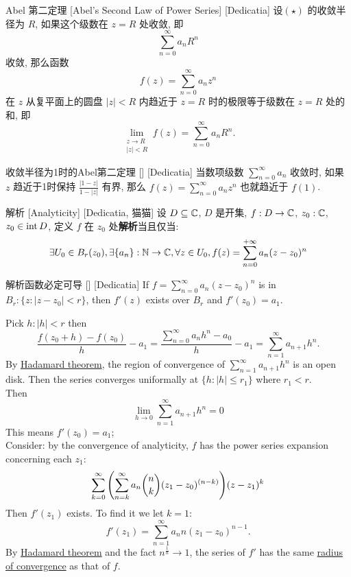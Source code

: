         \begin{thm}
            [Abel]
            {Abel 第二定理}
            [Abel's Second Law of Power Series]
            [Dedicatia]
            设\PowerSeries  \((\star)\) 的收敛半径为 \(R\), 如果这个级数在 \(z = R\) 处收敛, 即
            \[\sum_{n=0}^{\infty} a_n R^n\]
            收敛, 那么函数
            \[f(z) = \sum_{n=0}^{\infty} a_n z^n\]
            在 \(z\) 从复平面上的圆盘 \(|z| < R\) 内趋近于 \(z = R\) 时的极限等于级数在 \(z = R\) 处的和, 即
            \[\lim_{\substack{z \to R \\ |z| < R}} f(z) = \sum_{n=0}^{\infty} a_n R^n.\]
        \end{thm}

        \begin{xmp}
            {收敛半径为1时的Abel第二定理}
            []
            [Dedicatia]
            当数项级数 \(\sum\limits_{n=0}^\infty a_n\) 收敛时, 如果 \(z\) 趋近于1时保持 \(\frac{|1-z|}{1-|z|}\) 有界, 那么 \(f(z)=\sum\limits_{n=0}^\infty a_nz^n\) 也就趋近于 \(f(1)\).
        \end{xmp}

        \begin{dfn}
            [Analyticity]
            {解析}
            [Analyticity]
            [Dedicatia, 猫猫]
            设 \(D\subseteq\operatorname{\mathbb{C}}\), \(D\) 是开集, \(f:D\to\operatorname{\mathbb{C}}\), \(z_0:\operatorname{\mathbb{C}}\), \(z_0\in\operatorname{int} D\), 定义 \(f\) 在 \(z_0\) 处\textbf{解析}当且仅当: 
            \[\exists U_0\in B_r(z_0), \exists \{a_n\}:\operatorname{\mathbb{N}}\to\operatorname{\mathbb{C}}, \forall z\in U_0, f(z)=\sum_{n=0}^{+\infty}a_n(z-z_0)^n\]
        \end{dfn}

        \begin{ppt}
            {解析函数必定可导}
            []
            [Dedicatia]
            If $f=\sum\limits_{n=0}^{\infty}a_n(z-z_0)^n$ is \Analytic{} in $B_r:\{z:|z-z_0|<r\}$, then $f'(z)$ exists over $B_r$ and $f'(z_0)=a_1$.
        \end{ppt}

        \begin{prf}
            Pick $h:|h|<r$ then
            \[\frac{f(z_0+h)-f(z_0)}{h}-a_1=\frac{\sum\limits_{n=0}^{\infty}a_nh^n-a_0}{h}-a_1=\sum_{n=1}^{\infty}a_{n+1}h^n.\]
            By \hyperref[thm:Hadamard]{Hadamard theorem}, the region of convergence of $\sum\limits_{n=1}^{\infty}a_{n+1}h^n$ is an open disk. Then the series converges uniformally at $\{h:|h|\leq r_1\}$ where $r_1<r$.\\
            Then
            \[\lim_{h\to 0}\sum_{n=1}^{\infty}a_{n+1}h^n=0 \]
            This means $f'(z_0)=a_1$;\\
            Consider: by the convergence of analyticity, $f$ has the power series expansion concerning each $z_1$:
            \[\sum_{k=0}^{\infty}\qty(\sum_{n=k}^{\infty}a_n\binom{n}{k}(z_1-z_0)^{(n-k)})(z-z_1)^k\]
            Then $f'(z_1)$ exists. To find it we let $k=1$:
            \[f'(z_1)=\sum_{n=1}^{\infty}a_nn(z_1-z_0)^{n-1}.\]
            By \hyperref[thm:Hadamard]{Hadamard theorem} and the fact $n^{\frac{1}{n}}\to 1$, the series of $f'$ has the same \hyperref[thm:Hadamard]{radius of convergence} as that of $f$.
        \end{prf}
        
